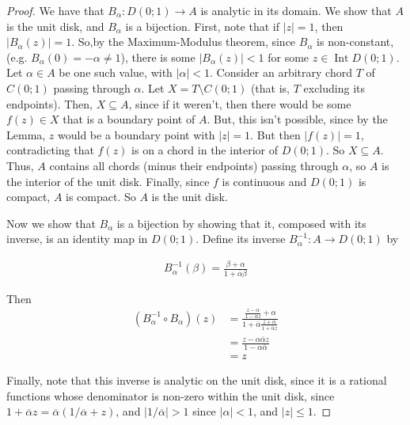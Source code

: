 \documentclass[11pt, letterpaper]{article}
\begin{document}
\begin{enumerate}
  \begin{proof}
    We have that $B_\alpha: D(0; 1) \to A$ is analytic in its domain. We show that $A$ is the unit disk, and $B_\alpha$ is a bijection. First, note that if $\vert z \vert = 1$, then $\vert B_\alpha(z) \vert = 1$. So,by the Maximum-Modulus theorem, since $B_\alpha$ is non-constant, (e.g. $B_\alpha(0) = -\alpha \neq 1$), there is some $\vert B_\alpha(z) \vert < 1$ for some $z \in \operatorname{Int} D(0; 1)$. Let $\alpha \in A$ be one such value, with $\vert \alpha \vert < 1$. Consider an arbitrary chord $T$ of $C(0; 1)$ passing through $\alpha$. Let $X = T \setminus C(0; 1)$ (that is, $T$ excluding its endpoints). Then, $X \subseteq A$, since if it weren't, then there would be some $f(z) \in X$ that is a boundary point of $A$. But, this isn't possible, since by the Lemma, $z$ would be a boundary point with $\vert z \vert = 1$. But then $\vert f(z) \vert = 1$, contradicting that $f(z)$ is on a chord in the interior of $D(0; 1)$. So $X \subseteq A$. Thus, $A$ contains all chords (minus their endpoints) passing through $\alpha$, so $A$ is the interior of the unit disk. Finally, since $f$ is continuous and $D(0; 1)$ is compact, $A$ is compact. So $A$ is the unit disk.

    Now we show that $B_\alpha$ is a bijection by showing that it, composed with its inverse, is an identity map in $D(0; 1)$. Define its inverse $B_\alpha^{-1}: A \to D(0; 1)$ by

    \begin{align*}
      B_\alpha^{-1}(\beta) = \frac{\beta + \alpha}{1 + \overline{\alpha}\beta}
    \end{align*}

    Then \begin{align*}
      (B_\alpha^{-1} \circ B_\alpha)(z)
      &= \frac{\frac{z - \alpha}{1 - \overline{\alpha}z} + \alpha}
      {1 + \overline{\alpha}\frac{z + \alpha}{1 + \overline{\alpha}z}} \\
      &= \frac{z - \alpha \bar \alpha z}{1 - \alpha \bar \alpha} \\
      &= z
    \end{align*}

    Finally, note that this inverse is analytic on the unit disk, since it is a rational functions whose denominator is non-zero within the unit disk, since $1 + \overline \alpha z = \overline \alpha(1/\overline \alpha + z)$, and $\vert 1/\overline \alpha \vert > 1$ since $\vert \alpha \vert < 1$, and $\vert z \vert \leq 1$.
  \end{proof}


\end{enumerate}
\end{document}
